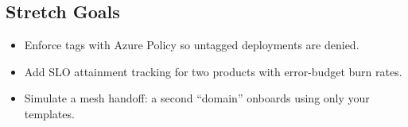 \subsection*{Stretch Goals}
\begin{itemize}
    \item Enforce tags with Azure Policy so untagged deployments are denied.
    \item Add SLO attainment tracking for two products with error-budget burn rates.
    \item Simulate a mesh handoff: a second ``domain'' onboards using only your templates.
\end{itemize}

